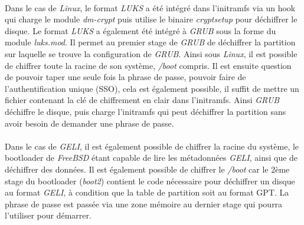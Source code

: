 \paragraph{}
Dans le cas de {\em Linux}, le format {\em LUKS} a été intégré dans
l'initramfs via un hook qui charge le module {\em dm-crypt} puis utilise 
le binaire {\em cryptsetup} pour déchiffrer le disque. 
Le format {\em LUKS} a également été intégré à {\em GRUB} sous la 
forme du module {\em luks.mod}. Il permet au premier stage de {\em GRUB} de 
déchiffrer la partition sur laquelle se trouve la configuration de {\em GRUB}.
Ainsi sous {\em Linux}, il est possible de chiffrer toute la racine de son 
système, {\em /boot} compris. Il est ensuite question de pouvoir taper une 
seule fois la phrase de passe, 
pouvoir faire de l'authentification unique (SSO), cela est 
également possible, il suffit de mettre un fichier contenant la clé de 
chiffrement en clair dans l'initramfs. Ainsi {\em GRUB} déchiffre le disque, 
puis charge l'initramfs qui peut déchiffrer la partition sans avoir besoin 
de demander une phrase de passe.

\paragraph{}
Dans le cas de {\em GELI}, il est également possible de chiffrer la racine du 
système, le bootloader de {\em FreeBSD} étant capable de lire les métadonnées 
{\em GELI}, ainsi que de déchiffrer des données. 
Il est également possible de chiffrer le 
{\em /boot} car le 2ème stage du bootloader ({\em boot2}) contient le code 
nécessaire pour déchiffrer un disque au format {\em GELI}, à condition que 
la table de partition soit au format GPT. La phrase de passe est passée via 
une zone mémoire au dernier stage qui pourra l'utiliser pour démarrer.

